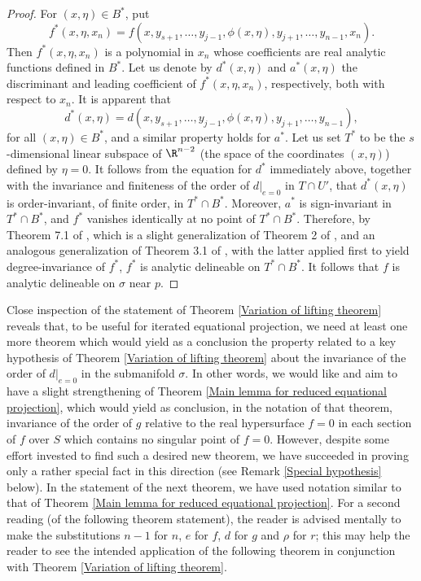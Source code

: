 \documentclass{article}
\begin{document}
\begin{proof}
For $(x, \eta) \in B^*$, put 
\[f^*(x, \eta, x_n) = f(x, y_{s+1}, \ldots, y_{j-1}, \phi(x, \eta),
                          y_{j+1}, \ldots, y_{n-1}, x_n).\]
Then $f^*(x, \eta, x_n)$ is a polynomial in $x_n$ whose coefficients
are real analytic functions defined in $B^*$.
Let us denote by $d^*(x, \eta)$ and $a^*(x, \eta)$ 
the discriminant and leading coefficient of $f^*(x, \eta, x_n)$,
respectively, both with respect to $x_n$. It is apparent that 
\[d^*(x, \eta) = d(x, y_{s+1}, \ldots, y_{j-1}, \phi(x, \eta),
                      y_{j+1}, \ldots, y_{n-1}),\]
for all $(x, \eta) \in B^*$, and a similar property holds for $a^*$. 
Let us set $T^*$ to be the $s$-dimensional
linear subspace of $\R^{n-2}$ (the space of the coordinates $(x, \eta)$)
defined by $\eta = 0$. It follows from the equation for $d^*$
immediately above,
together with the invariance and finiteness of the order of $d|_{e=0}$ in 
$T \cap U'$, that $d^*(x, \eta)$ is order-invariant, of finite order,
in $T^* \cap B^*$. Moreover, $a^*$ is sign-invariant in $T^* \cap B^*$,
and $f^*$ vanishes identically at no point of $T^* \cap B^*$.
Therefore, by Theorem 7.1 of \cite{McCallum2001},
which is a slight generalization of Theorem 2 of \cite{McCallum1998},
and an analogous generalization of Theorem 3.1 of \cite{Brown2001},
with the latter applied first to yield degree-invariance of $f^*$,
$f^*$ is analytic delineable on $T^* \cap B^*$.
It follows that $f$ is analytic delineable on $\sigma$ near $p$.
\end{proof}

Close inspection of the statement of Theorem \ref{Variation of lifting 
theorem} reveals that, to be useful for iterated equational 
projection, we need at least one more theorem which would yield as a 
conclusion the property related to a key hypothesis of
Theorem \ref{Variation of lifting theorem} about the invariance of the 
order of $d|_{e=0}$ in the submanifold $\sigma$.
In other words, we would like and aim to have a slight strengthening of
Theorem \ref{Main lemma for reduced equational projection},
which would yield as conclusion, in the notation of that theorem, 
invariance of
the order of $g$ relative to the real hypersurface $f = 0$ in each section
of $f$ over $S$ which contains no singular point of $f=0$. However,
despite some effort invested to find such a desired new theorem,
we have succeeded in proving only a rather special fact
in this direction (see Remark \ref{Special hypothesis} below).
In the statement of the next theorem, we have used notation similar to
that of Theorem \ref{Main lemma for reduced equational projection}.
For a second reading (of the following theorem statement), the reader is 
advised mentally to make the substitutions $n-1$ for $n$, $e$ for $f$, 
$d$ for $g$ and $\rho$ for $r$; this may help the reader to see the
intended application of the following theorem in conjunction with
Theorem \ref{Variation of lifting theorem}.
\end{document}

